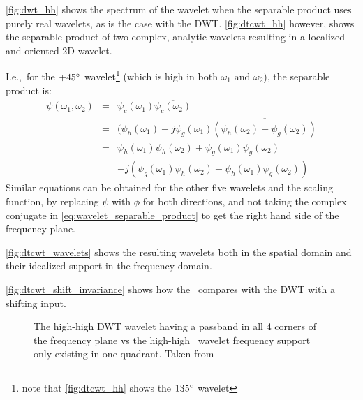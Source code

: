   \autoref{fig:dwt_hh} shows the spectrum of
  the wavelet when the separable product uses purely real wavelets, as is the
  case with the DWT\@. \autoref{fig:dtcwt_hh} however, shows the separable
  product of two complex, analytic wavelets resulting in a localized and
  oriented 2D wavelet.  
  
  I.e.,\ for the $+45{^{\circ}}$ wavelet\footnote{note that \autoref{fig:dtcwt_hh}
  shows the $135{^{\circ}}$ wavelet} (which is high
  in both $\omega_1$ and $\omega_2$), the separable product is:
  \begin{eqnarray}
    \psi(\omega_1,\omega_2) & = & \psi_c (\omega_1) \overline{\psi_c
      (\omega_2) } \label{eq:wavelet_separable_product}\\
    & = & (\psi_h(\omega_1) + j \psi_g(\omega_1) \overline{\left(\psi_h(\omega_2)
      + \psi_g(\omega_2) \right)} \nonumber\\
    & = & \psi_h(\omega_1) \psi_h(\omega_2) + \psi_g(\omega_1)
      \psi_g(\omega_2)\nonumber\\
    &&  + j\left( \psi_g(\omega_1) \psi_h(\omega_2) - \psi_h(\omega_1)
        \psi_g(\omega_2) \right)  \label{eq:dtcwt_2d_product}
  \end{eqnarray}
  Similar equations can be obtained for the other five wavelets and the scaling
  function, by replacing
  $\psi$ with $\phi$ for both directions, and not taking the complex conjugate
  in \autoref{eq:wavelet_separable_product} to get the right hand side of the
  frequency plane. 
  
  \autoref{fig:dtcwt_wavelets} shows the resulting wavelets both in the spatial
  domain and their idealized support in the frequency domain.

  \autoref{fig:dtcwt_shift_invariance} shows how the \DTCWT\ compares with the
  DWT with a shifting input.

  \begin{figure}
      \subfloat[]{\makebox[\textwidth][c]{%
        \label{fig:dwt_hh}}}
      \newline
      \subfloat[]{\makebox[\textwidth][c]{%
        \label{fig:dtcwt_hh}}}
      \caption[The DWT high-high vs the \DTCWT\ high-high frequency support]
              { The high-high DWT wavelet having a passband in
              all 4 corners of the frequency plane vs  the
              high-high \DTCWT\ wavelet frequency support only existing in one
              quadrant. Taken from \citep{selesnick_dual-tree_2005}}
      \label{fig:dwt_dtcwt_hh}
  \end{figure}

